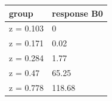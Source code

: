 \begingroup\small
\setlength{\tabcolsep}{3pt}
\renewcommand{\arraystretch}{1.04}
\begin{tabularx}{\linewidth}{XX}
\toprule
group & response B0 \\
\midrule
z = 0.103 & 0 \\
z = 0.171 & 0.02 \\
z = 0.284 & 1.77 \\
z = 0.47 & 65.25 \\
z = 0.778 & 118.68 \\
\bottomrule
\end{tabularx}
\endgroup

